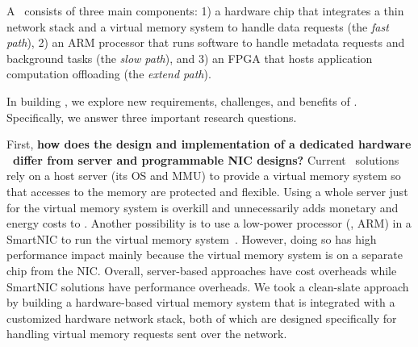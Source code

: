 A \sysboard\ consists of three main components: 1) a hardware chip that integrates a thin network stack and a virtual memory system to handle data requests (the {\em fast path}), 2) an ARM processor that runs software to handle metadata requests and background tasks (the {\em slow path}), and 3) an FPGA that hosts application computation offloading (the {\em extend path}).

In building \sys, we explore new requirements, challenges, and benefits of \md.
Specifically, we answer three important research questions.

First, \textbf{how does the design and implementation of a
dedicated hardware \MN\ differ from server and programmable NIC
designs?}
Current \md\ solutions rely on a host server (its OS and MMU) to provide a virtual memory system so that accesses to the memory are protected and flexible. 
Using a whole server just for the virtual memory system is overkill and unnecessarily adds monetary and energy costs to \md. %
Another possibility is to use a low-power processor (\eg, ARM) in a SmartNIC to run the virtual memory system~\cite{iPipe}. 
However, doing so has high performance impact mainly because the virtual memory system is on a separate chip from the NIC.
Overall, server-based approaches have cost overheads while SmartNIC solutions have performance overheads.
We took a clean-slate approach by building a hardware-based virtual memory system that is integrated with a customized hardware network stack, 
both of which are designed specifically for handling virtual memory requests sent over the network.

